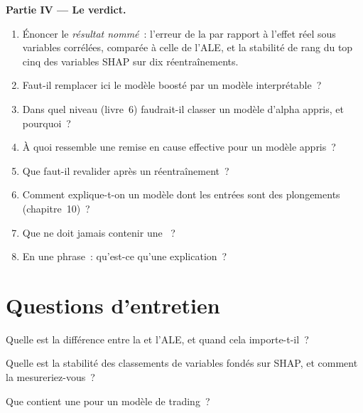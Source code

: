 \begin{problem}
\medskip\noindent\textbf{Partie IV --- Le verdict.}
\begin{enumerate}[resume]
\item Énoncer le \emph{résultat nommé}~: l'erreur de la  par rapport à l'effet réel sous variables corrélées, comparée à
celle de l'ALE, et la stabilité de rang du top cinq des variables SHAP sur dix réentraînements.
\item Faut-il remplacer ici le modèle boosté par un modèle interprétable~?
\item Dans quel niveau (livre~6) faudrait-il classer un modèle d'alpha appris, et pourquoi~?
\item À quoi ressemble une remise en cause effective pour un modèle appris~?
\item Que faut-il revalider après un réentraînement~?
\item Comment explique-t-on un modèle dont les entrées sont des plongements (chapitre~10)~?
\item Que ne doit jamais contenir une ~?
\item En une phrase~: qu'est-ce qu'une explication~?
\end{enumerate}
\end{problem}

\section{Questions d'entretien}

\begin{interviewq}\label{iq:ml:interpretability-and-model-governance:1}
Quelle est la différence entre la  et l'ALE, et quand cela importe-t-il~?
\end{interviewq}

\begin{interviewq}\label{iq:ml:interpretability-and-model-governance:2}
Quelle est la stabilité des classements de variables fondés sur SHAP, et comment la mesureriez-vous~?
\end{interviewq}

\begin{interviewq}\label{iq:ml:interpretability-and-model-governance:3}
Que contient une  pour un modèle de trading~?
\end{interviewq}

